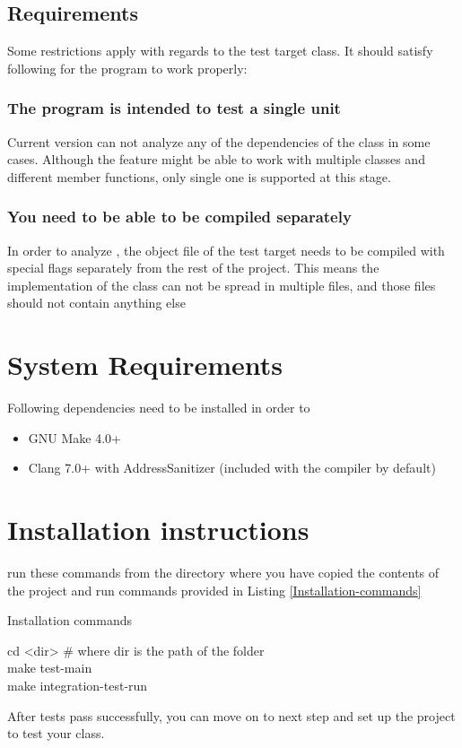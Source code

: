 \documentclass{elteikthesis}[2018/06/06]
\begin{document}
\subsection{Requirements}
\label{sec-2-1-1}
Some restrictions apply with regards to the test target class. It should satisfy following for the program to work properly: \\
\subsubsection{The program is intended to test a single unit}
\label{sec-2-1-1-1}
Current version can not analyze any of the dependencies of the class in some cases. Although the feature might be able to work with multiple classes and different member functions, only single one is supported at this stage. \\
\subsubsection{You need to be able to be compiled separately}
\label{sec-2-1-1-2}
In order to analyze , the object file of the test target needs to be compiled with special flags separately from the rest of the project. This means the implementation of the class can not be spread in multiple files, and those files should not contain anything else \\
\section{System Requirements}
\label{sec-2-2}
Following dependencies need to be installed in order to \\
\begin{itemize}
\item GNU Make 4.0+ \\
\item Clang 7.0+ with AddressSanitizer (included with the compiler by default) \\
\end{itemize}
\section{Installation instructions}
\label{sec-2-3}
run these commands from the directory where you have copied the contents of the project and run commands provided in Listing \ref{Installation-commands} \\
\begin{listing}
\caption{\label{Installation-commands}Installation commands}
cd <dir> \# where dir is the path of the folder \\

make test-main \\

make integration-test-run \\
\end{listing}
After tests pass successfully, you can move on to next step and set up the project to test your class. \\
\end{document}

